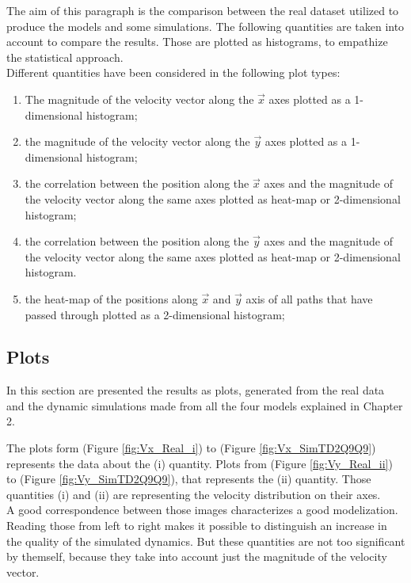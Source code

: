 \documentclass[class=article, crop=false]{standalone}
\begin{document}
The aim of this paragraph is the comparison between the real dataset utilized to produce the models and some simulations.
The following quantities are taken into account to compare the results.
Those are plotted as histograms, to empathize the statistical approach.
\\Different quantities have been considered in the following plot types:
\begin{enumerate}[label=(\roman*)]
\item The magnitude of the velocity vector along the $\vec x$ axes plotted as a 1-dimensional histogram;
\item the magnitude of the velocity vector along the $\vec y$ axes plotted as a 1-dimensional histogram;
\item the correlation between the position along the $\vec x$ axes and the magnitude of the velocity vector along the same axes plotted as heat-map or 2-dimensional histogram;
\item the correlation between the position along the $\vec y$ axes and the magnitude of the velocity vector along the same axes plotted as heat-map or 2-dimensional histogram.
\item the heat-map of the positions along $\vec x$ and $\vec y$ axis of all paths that have passed through plotted as a 2-dimensional histogram;
\end{enumerate}

\FloatBarrier
\subsection{Plots}
In this section are presented the results as plots, generated from the real data and the dynamic simulations made from all the four models explained in Chapter 2.

The plots form (Figure \ref{fig:Vx_Real_i}) to (Figure \ref{fig:Vx_SimTD2Q9Q9}) represents the data about the (i) quantity.
Plots from (Figure \ref{fig:Vy_Real_ii}) to (Figure \ref{fig:Vy_SimTD2Q9Q9}), that represents the (ii) quantity.
Those quantities (i) and (ii) are representing the velocity distribution on their axes.
\\ A good correspondence between those images characterizes a good modelization.
Reading those from left to right makes it possible to distinguish an increase in the quality of the simulated dynamics.
But these quantities are not too significant by themself, because they take into account just the magnitude of the velocity vector.
\end{document}
